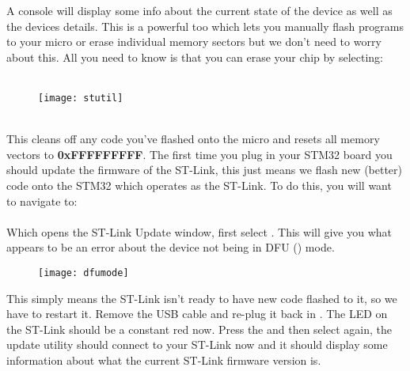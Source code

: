 \par
{}
\newpage
A console will display some info about the current state of the device as well as the devices details.  This is a powerful too which lets you manually flash programs to your micro  or erase individual memory sectors but we don't need to worry about this. All you need to know is that you can erase your chip by selecting:\\
\-\ \hspace{20pt}
\\
\begin{figure}[htbp]
\centering
\texttt{[image: stutil]}
\end{figure}
\\
This cleans off any code you've flashed onto the micro and resets all memory vectors to \textbf{0xFFFFFFFFF}.
The first \underline{} time you plug in your STM32 board you should update the firmware of the ST-Link, this just means we flash new (better) code onto the STM32 which operates as the ST-Link.
To do this, you will want to navigate to:\\
\-\ \hspace{20pt} 
\\
Which opens the ST-Link Update window, first select . This will give you what appears to be an error about the device not being in DFU (\underline{}) mode.\\
\begin{figure}[hbtp]
\centering
\texttt{[image: dfumode]}
\end{figure}
\par
This simply means the ST-Link isn't ready to have new code flashed to it, so we have to restart it. Remove the USB cable and re-plug it back in {\color{red}\underline{}}. The LED on the ST-Link should be a constant red now.
\newpage
Press the  and then select  again, the update utility should connect to your ST-Link now and it should display some information about what the current ST-Link firmware version is.

